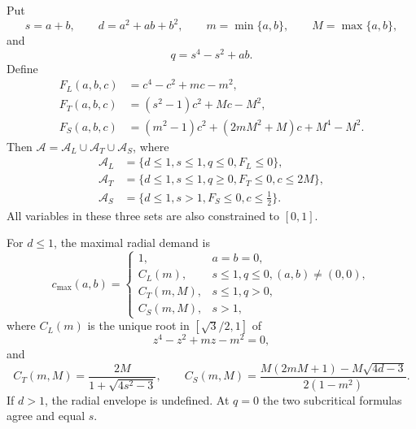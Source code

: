 \begin{proposition}
\label{prop:exact-admissible-set}
\label{prop:local-admissible}
Put
\[
 s=a+b,\qquad d=a^2+ab+b^2,\qquad
 m=\min\{a,b\},\qquad M=\max\{a,b\},
\]
and
\[
 q=s^4-s^2+ab.
\]
Define
\begin{align*}
 F_L(a,b,c)&=c^4-c^2+mc-m^2,\\
 F_T(a,b,c)&=(s^2-1)c^2+Mc-M^2,\\
 F_S(a,b,c)&=(m^2-1)c^2+(2mM^2+M)c+M^4-M^2.
\end{align*}
Then $\mathcal A=\mathcal A_L\cup\mathcal A_T\cup\mathcal A_S$, where
\begin{align*}
 \mathcal A_L&=\{d\le1, s\le1, q\le0, F_L\le0\},\\
 \mathcal A_T&=\{d\le1, s\le1, q\ge0, F_T\le0, c\le2M\},\\
 \mathcal A_S&=\{d\le1, s>1, F_S\le0, c\le\tfrac12\}.
\end{align*}
All variables in these three sets are also constrained to $[0,1]$.

For $d\le1$, the maximal radial demand is
\begin{equation}
 c_{\max}(a,b)=
 \begin{cases}
  1,&a=b=0,\\
  C_L(m),&s\le1, q\le0, (a,b)\ne(0,0),\\
  C_T(m,M),&s\le1, q>0,\\
  C_S(m,M),&s>1,
 \end{cases}
 \label{eq:radial-envelope}
\end{equation}
where $C_L(m)$ is the unique root in $[\sqrt3/2,1]$ of
\[
 z^4-z^2+mz-m^2=0,
\]
and
\[
 C_T(m,M)=\frac{2M}{1+\sqrt{4s^2-3}},
\qquad
 C_S(m,M)=
 \frac{M(2mM+1)-M\sqrt{4d-3}}{2(1-m^2)}.
\]
If $d>1$, the radial envelope is undefined.  At $q=0$ the two subcritical
formulas agree and equal $s$.
\end{proposition}

